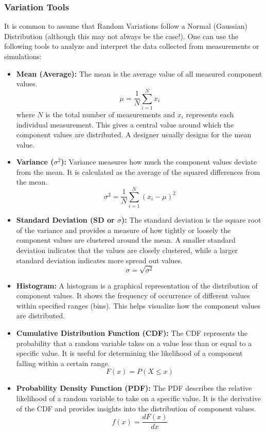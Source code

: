 \subsubsection{Variation Tools}
It is common to assume that Random Variations follow a Normal
(Gaussian) Distribution (although this may not always be the
case!). One can use the following tools to analyze and
interpret the data collected from measurements or simulations:
\begin{itemize}
  \item \textbf{Mean (Average):} The mean is the average value
    of all measured component values. $$\mu = \frac{1}{N} \sum_{i=1}^{N} x_i$$
    where \(N\) is the total number of measurements and \(x_i\)
    represents each individual measurement. This gives a
    central value around which the component values are
    distributed. A designer usually designs for the mean value.
  \item \textbf{Variance (\(\sigma^2\)):} Variance measures how
    much the component values deviate from the mean. It is
    calculated as the average of the squared differences from
    the mean. $$\sigma^2 = \frac{1}{N} \sum_{i=1}^{N} (x_i - \mu)^2$$
  \item \textbf{Standard Deviation (SD or \(\sigma\)):} The
    standard deviation is the square root of the variance and
    provides a measure of how tightly or loosely the
    component values are clustered around the mean. A smaller
    standard deviation indicates that the values are closely
    clustered, while a larger standard deviation indicates
    more spread out values. $$\sigma = \sqrt{\sigma^2}$$
  \item \textbf{Histogram:} A histogram is a graphical
    representation of the distribution of component values. It
    shows the frequency of occurrence of different values
    within specified ranges (bins). This helps visualize how
    the component values are distributed.
  \item \textbf{Cumulative Distribution Function (CDF):} The CDF
    represents the probability that a random variable takes on
    a value less than or equal to a specific value. It is useful
    for determining the likelihood of a component falling within
    a certain range. $$F(x) = P(X \leq x)$$
  \item \textbf{Probability Density Function (PDF):} The PDF
    describes the relative likelihood of a random variable to
    take on a specific value. It is the derivative of the CDF and
    provides insights into the distribution of component values.
    $$f(x) = \frac{dF(x)}{dx}$$
\end{itemize}

